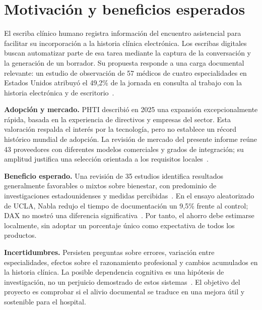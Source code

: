 \section{Motivación y beneficios esperados}
\label{sec:motivacion}
El escriba clínico humano registra información del encuentro asistencial para facilitar su incorporación a la historia clínica electrónica. Los escribas digitales buscan automatizar parte de esa tarea mediante la captura de la conversación y la generación de un borrador. Su propuesta responde a una carga documental relevante: un estudio de observación de 57 médicos de cuatro especialidades en Estados Unidos atribuyó el 49,2\% de la jornada en consulta al trabajo con la historia electrónica y de escritorio~\cite{7MXFHMBA,sinsky2016}.

\textbf{Adopción y mercado.} PHTI describió en 2025 una expansión excepcionalmente rápida, basada en la experiencia de directivos y empresas del sector. Esta valoración respalda el interés por la tecnología, pero no establece un récord histórico mundial de adopción. La revisión de mercado del presente informe reúne 43 proveedores con diferentes modelos comerciales y grados de integración; su amplitud justifica una selección orientada a los requisitos locales~\cite{FKHM4UFL}.

\textbf{Beneficio esperado.} Una revisión de 35 estudios identifica resultados generalmente favorables o mixtos sobre bienestar, con predominio de investigaciones estadounidenses y medidas percibidas~\cite{4PZBAAZ7}. En el ensayo aleatorizado de UCLA, Nabla redujo el tiempo de documentación un 9,5\% frente al control; DAX no mostró una diferencia significativa~\cite{PR93N8FN}. Por tanto, el ahorro debe estimarse localmente, sin adoptar un porcentaje único como expectativa de todos los productos.

\textbf{Incertidumbres.} Persisten preguntas sobre errores, variación entre especialidades, efectos sobre el razonamiento profesional y cambios acumulados en la historia clínica. La posible dependencia cognitiva es una hipótesis de investigación, no un perjuicio demostrado de estos sistemas~\cite{ZI87XIWC}. El objetivo del proyecto es comprobar si el alivio documental se traduce en una mejora útil y sostenible para el hospital.
